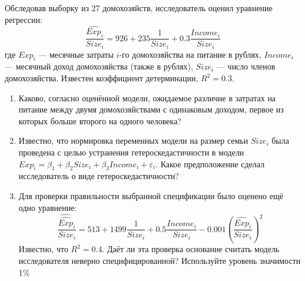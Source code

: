\begin{problem}
Обследовав выборку из 27 домохозяйств, исследователь оценил уравнение регрессии:
\[
\frac{\widehat{Exp}_i}{Size_i}=926+235\frac{1}{Size_i}+0.3\frac{Income_i}{Size_i}
\]
где $Exp_i$ — месячные затраты $i$-го домохозяйства на питание в рублях, $Income_i$ — месячный доход домохозяйства (также в рублях),  $Size_i$ — число членов домохозяйства. Известен коэффициент детерминации, $R^2=0.3$.

\begin{enumerate}
\item Каково, согласно оценённой модели, ожидаемое различие в затратах на питание между двумя домохозяйствами с одинаковым доходом, первое из которых больше второго на одного человека?
\item Известно, что нормировка переменных модели на размер семьи $Size_i$ была проведена с целью устранения гетероскедастичности в модели $Exp_i=\beta_1+\beta_2 Size_i+\beta_3 Income_i+\varepsilon_i$. Какое предположение сделал исследователь о виде гетероскедастичности?
\item Для проверки правильности выбранной спецификации было оценено ещё одно уравнение:
\[
\frac{\widehat{\widehat{Exp}}_i}{Size_i}=513+1499\frac{1}{Size_i}+0.5\frac{Income_i}{Size_i}-0.001\left(\frac{\widehat{Exp}_i}{Size_i}\right)^2
\]
Известно, что $R^2=0.4$. Даёт ли эта проверка основание считать модель исследователя неверно специфицированной? Используйте уровень значимости 1\%
\end{enumerate}


\begin{sol}
\end{sol}
\end{problem}








